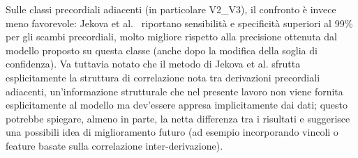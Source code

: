 Sulle classi precordiali adiacenti (in particolare V2\_V3), il confronto è invece meno favorevole: Jekova et al.~\cite{jekova2016interlead} riportano sensibilità e specificità superiori al 99\% per gli scambi precordiali, molto migliore rispetto alla precisione ottenuta dal modello proposto su questa classe (anche dopo la modifica della soglia di confidenza). Va tuttavia notato che il metodo di Jekova et al. sfrutta esplicitamente la struttura di correlazione nota tra derivazioni precordiali adiacenti, un'informazione strutturale che nel presente lavoro non viene fornita esplicitamente al modello ma dev'essere appresa implicitamente dai dati; questo potrebbe spiegare, almeno in parte, la netta differenza tra i risultati e suggerisce una possibili idea di miglioramento futuro (ad esempio incorporando vincoli o feature basate sulla correlazione inter-derivazione).

